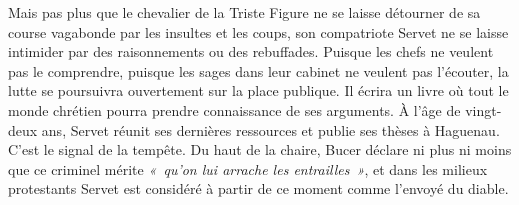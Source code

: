 \documentclass[french,twoside]{book} %
\begin{document}
Mais pas plus que le chevalier de la Triste Figure ne se laisse détourner de sa course vagabonde par les insultes et les coups, son compatriote Servet ne se laisse intimider par des raisonnements ou des rebuffades. Puisque les chefs ne veulent pas le comprendre, puisque les sages dans leur cabinet ne veulent pas l’écouter, la lutte se poursuivra ouvertement sur la place publique. Il écrira un livre où tout le monde chrétien pourra prendre connaissance de ses arguments. À l’âge de vingt-deux ans, Servet réunit ses dernières ressources et publie ses thèses à Haguenau. C’est le signal de la tempête. Du haut de la chaire, Bucer déclare ni plus ni moins que ce criminel mérite \emph{« qu’on lui arrache les entrailles »}, et dans les milieux protestants Servet est considéré à partir de ce moment comme l’envoyé du diable.\par
\end{document}
